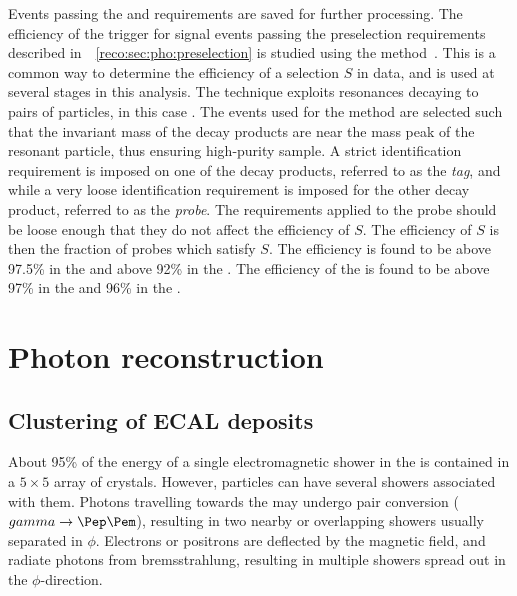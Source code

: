 Events passing the \LI and \HLT requirements are saved for further processing. The efficiency of the trigger for signal events passing the preselection requirements described in~\Sec~\ref{reco:sec:pho:preselection} is studied using the \TagAndProbe method~\cite{TagAndProbe}. This is a common way to determine the efficiency of a selection $S$ in data, and is used at several stages in this analysis. The technique exploits resonances decaying to pairs of particles, in this case \Zee. The events used for the \TagAndProbe method are selected such that the invariant mass of the decay products are near the mass peak of the resonant particle, thus ensuring high-purity sample. A strict identification requirement is imposed on one of the decay products, referred to as the \emph{tag}, and while a very loose identification requirement is imposed for the other decay product, referred to as the \emph{probe}. The requirements applied to the probe should be loose enough that they do not affect the efficiency of $S$. The efficiency of $S$ is then the fraction of probes which satisfy $S$. 
The \LI efficiency is found to be above 97.5\% in the \EB and above 92\% in the \EE. The efficiency of the \HLT is found to be above 97\% in the \EB and 96\% in the \EE. %


\section{Photon reconstruction} 
\label{reco:sec:photons}



\subsection{Clustering of ECAL deposits}

About 95\% of the energy of a single electromagnetic shower in the \ECAL is contained in a $5\times5$ array of crystals. However, particles can have several showers associated with them. Photons travelling towards the \ECAL may undergo pair conversion ($\gamma \rightarrow \Pep \Pem$), resulting in two nearby or overlapping showers usually separated in $\phi$. Electrons or positrons are deflected by the magnetic field, and radiate photons from bremsstrahlung, resulting in multiple showers spread out in the $\phi$-direction. 

